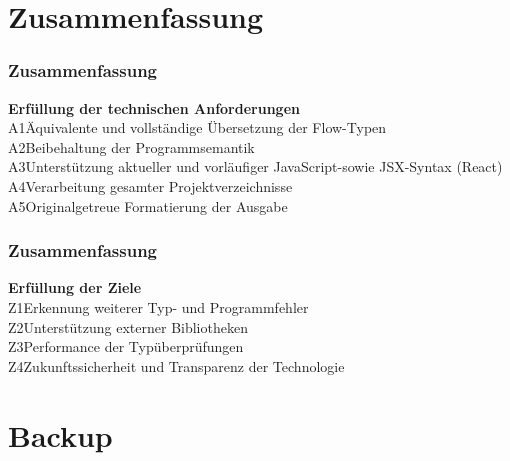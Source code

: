   \section{Zusammenfassung}

    \begin{frame}
      \frametitle{Zusammenfassung}
      \textbf{Erfüllung der technischen Anforderungen}\\[1em]
      A1\hspace{0.75em}Äquivalente und vollständige Übersetzung der Flow-Typen\\[.6em]
      A2\hspace{0.75em}Beibehaltung der Programmsemantik\\[.6em]
      A3\hspace{0.75em}Unterstützung aktueller und vorläufiger JavaScript-\secframebr sowie JSX-Syntax (React)\\[.6em]
      A4\hspace{0.75em}Verarbeitung gesamter Projektverzeichnisse\\[.6em]
      A5\hspace{0.75em}Originalgetreue Formatierung der Ausgabe
    \end{frame}

    \begin{frame}
      \frametitle{Zusammenfassung}
      \textbf{Erfüllung der Ziele}\\[1em]
      Z1\hspace{0.75em}Erkennung weiterer Typ- und Programmfehler\\[.6em]
      Z2\hspace{0.75em}Unterstützung externer Bibliotheken\\[.6em]
      Z3\hspace{0.75em}Performance der Typüberprüfungen\\[.6em]
      Z4\hspace{0.75em}Zukunftssicherheit und Transparenz der Technologie
    \end{frame}

  \appendix
    \begin{frame}
    \end{frame}

  \section{Backup}

